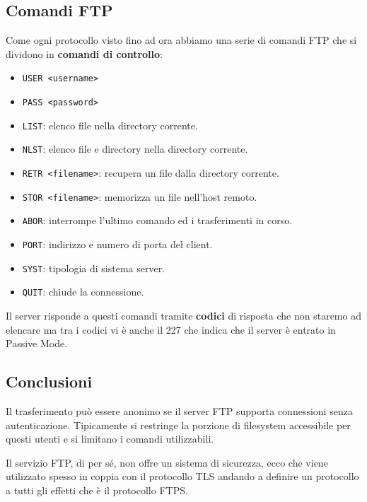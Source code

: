 \subsection{Comandi FTP}
Come ogni protocollo visto fino ad ora abbiamo una serie di comandi FTP
che si dividono in \textbf{comandi di controllo}:
\begin{itemize}
	\item \verb|USER <username>|
	\item \verb|PASS <password>|
	\item \verb|LIST|: elenco file nella directory corrente.
	\item \verb|NLST|: elenco file e directory nella directory 
		corrente.
	\item \verb|RETR <filename>|: recupera un file dalla directory 
		corrente.
	\item \verb|STOR <filename>|: memorizza un file nell'host remoto.
	\item \verb|ABOR|: interrompe l'ultimo comando ed i trasferimenti 
		in corso.
	\item \verb|PORT|: indirizzo e numero di porta del client.
	\item \verb|SYST|: tipologia di sistema server.
	\item \verb|QUIT|: chiude la connessione.
\end{itemize}
Il server risponde a questi comandi tramite \textbf{codici} di risposta
che non staremo ad elencare ma tra i codici vi è anche il 227 che 
indica che il server è entrato in Passive Mode.

\subsection{Conclusioni}
Il trasferimento può essere anonimo se il server FTP supporta 
connessioni senza autenticazione. Tipicamente si restringe la porzione 
di filesystem accessibile per questi utenti e si limitano i comandi 
utilizzabili.

Il servizio FTP, di per sé, non offre un sistema di sicurezza, ecco che
viene utilizzato spesso in coppia con il protocollo TLS andando a 
definire un protocollo a tutti gli effetti che è il protocollo FTPS.
